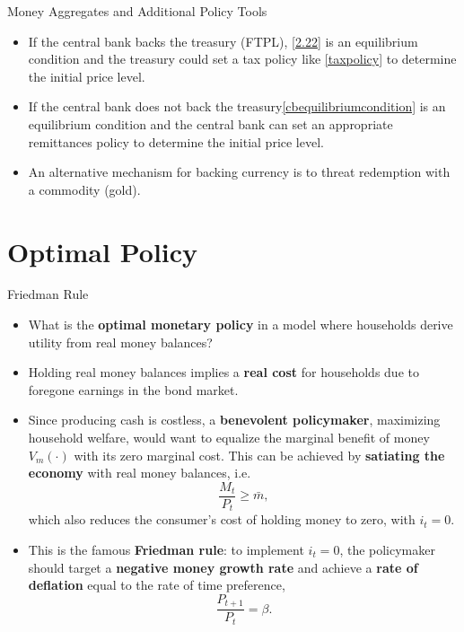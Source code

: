 \documentclass[11pt,aspectratio=169]{beamer}
\begin{document}
\begin{frame}{Money Aggregates and Additional Policy Tools}

\begin{itemize}
    \item If the central bank backs the treasury (FTPL), \eqref{2.22} is an equilibrium condition and the treasury could set a tax policy like \eqref{taxpolicy} to determine the initial price level.
    \vspace{0.25em}
    \item If the central bank does not back the treasury\eqref{cbequilibriumcondition} is an equilibrium condition and the central bank can set an appropriate remittances policy to determine the initial price level.\vspace{0.25em} 
    \item An alternative mechanism for backing currency is to threat redemption with a commodity (gold).
\end{itemize}

\end{frame}
\section{Optimal Policy}
\begin{frame}{Friedman Rule}
\small
\begin{itemize}

    \item What is the \textbf{optimal monetary policy} in a model where households derive utility from real money balances?
    \vspace{0.15em}

    \item Holding real money balances implies a \textbf{real cost} for households due to foregone earnings in the bond market.  
    \vspace{0.15em}

    \item Since producing cash is costless, a \textbf{benevolent policymaker}, maximizing household welfare, would want to equalize the marginal benefit of money $V_m(\cdot)$ with its zero marginal cost. This can be achieved by \textbf{satiating the economy} with real money balances, i.e.
    \[
        \frac{M_t}{P_t} \ge \bar{m},
    \]
    which also reduces the consumer’s cost of holding money to zero, with $i_t=0$.
    \vspace{0.15em}

    \item This is the famous \textbf{Friedman rule}: to implement $i_t=0$, the policymaker should target a \textbf{negative money growth rate} and achieve a \textbf{rate of deflation} equal to the rate of time preference,
    \vspace{-0.2cm}
    \[
        \frac{P_{t+1}}{P_t} = \beta.
    \]
\end{itemize}
\end{frame}
\end{document}

